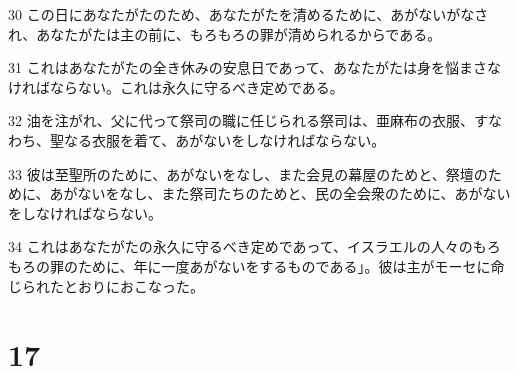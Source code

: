 \par 30 この日にあなたがたのため、あなたがたを清めるために、あがないがなされ、あなたがたは主の前に、もろもろの罪が清められるからである。
\par 31 これはあなたがたの全き休みの安息日であって、あなたがたは身を悩まさなければならない。これは永久に守るべき定めである。
\par 32 油を注がれ、父に代って祭司の職に任じられる祭司は、亜麻布の衣服、すなわち、聖なる衣服を着て、あがないをしなければならない。
\par 33 彼は至聖所のために、あがないをなし、また会見の幕屋のためと、祭壇のために、あがないをなし、また祭司たちのためと、民の全会衆のために、あがないをしなければならない。
\par 34 これはあなたがたの永久に守るべき定めであって、イスラエルの人々のもろもろの罪のために、年に一度あがないをするものである」。彼は主がモーセに命じられたとおりにおこなった。

\chapter{17}

